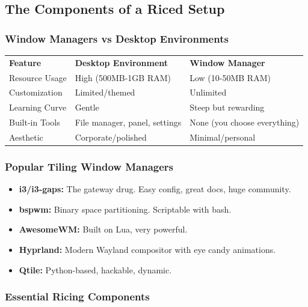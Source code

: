\documentclass[12pt]{article}
\begin{document}
\subsection*{The Components of a Riced Setup}

\subsubsection*{Window Managers vs Desktop Environments}

\begin{infobox}
\begin{tabular}{lll}
\textbf{Feature} & \textbf{Desktop Environment} & \textbf{Window Manager} \\
Resource Usage & High (500MB-1GB RAM) & Low (10-50MB RAM) \\
Customization & Limited/themed & Unlimited \\
Learning Curve & Gentle & Steep but rewarding \\
Built-in Tools & File manager, panel, settings & None (you choose everything) \\
Aesthetic & Corporate/polished & Minimal/personal \\
\end{tabular}
\end{infobox}

\subsubsection*{Popular Tiling Window Managers}

\begin{itemize}
    \item \textbf{i3/i3-gaps:} The gateway drug. Easy config, great docs, huge community.
    \item \textbf{bspwm:} Binary space partitioning. Scriptable with bash.
    \item \textbf{AwesomeWM:} Built on Lua, very powerful.
    \item \textbf{Hyprland:} Modern Wayland compositor with eye candy animations.
    \item \textbf{Qtile:} Python-based, hackable, dynamic.
\end{itemize}

\subsubsection*{Essential Ricing Components}
\end{document}
